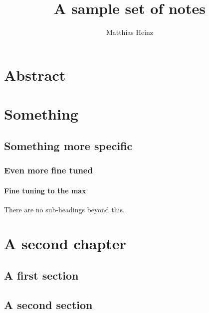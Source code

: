 \documentclass{memoir}
\begin{document}
\title{A sample set of notes}

\author{Matthias Heinz}
\frontmatter
\maketitle

\chapter{Abstract}
\lipsum[1]

\cleardoublepage\tableofcontents

\cleardoublepage\listoftables

\cleardoublepage\listoffigures

\mainmatter

\chapter{Something}

\section{Something more specific}

\subsection{Even more fine tuned}

\subsubsection{Fine tuning to the max}

There are no sub-headings beyond this.

\lipsum[1-10]

\chapter{A second chapter}

\lipsum[1-2]

\section{A first section}

\lipsum

\section{A second section}
\end{document}
